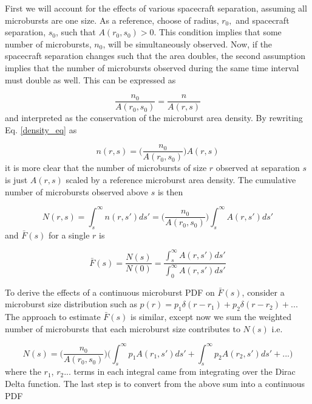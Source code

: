 \documentclass[draft]{agujournal2019}
\begin{document}
First we will account for the effects of various spacecraft separation, assuming all microbursts are one size. As a reference, choose of radius, $r_0,$ and spacecraft separation, $s_0$, such that $A(r_0, s_0) > 0$. This condition implies that some number of microbursts, $n_0$, will be simultaneously observed. Now, if the spacecraft separation changes such that the area doubles, the second assumption implies that the number of microbursts observed during the same time interval must double as well. This can be expressed as 

\begin{equation} \label{density_eq}
\frac{n_0}{A(r_0, s_0)} = \frac{n}{A(r, s)}
\end{equation} and interpreted as the conservation of the microburst area density. By rewriting Eq. \ref{density_eq} as

\begin{equation}
n(r, s) = \bigg( \frac{n_0}{A(r_0, s_0)} \bigg) A(r, s)
\end{equation} it is more clear that the number of microbursts of size $r$ observed at separation $s$ is just $A(r, s)$ scaled by a reference microburst area density. The cumulative number of microbursts observed above $s$ is then

\begin{equation}
N(r, s) = \int_{s}^\infty n(r, s') ds' = \bigg( \frac{n_0}{A(r_0, s_0)} \bigg) \int_{s}^\infty A(r, s') ds'
\end{equation} and $\bar{F}(s)$ for a single $r$ is

\begin{equation}
\bar{F}(s) = \frac{N(s)}{N(0)} = \frac{\int_{s}^\infty A(r, s') ds'}{\int_{0}^\infty A(r, s') ds'}
\end{equation}

To derive the effects of a continuous microburst PDF on $\bar{F}(s)$, consider a microburst size distribution such as $p(r) = p_1 \delta (r-r_1) + p_2 \delta (r-r_2) + ...$ The approach to estimate $\bar{F}(s)$ is similar, except now we sum the weighted number of microbursts that each microburst size contributes to $N(s)$ i.e.

\begin{equation}
N(s) = \bigg( \frac{n_0}{A(r_0, s_0)} \bigg) \bigg( \int_{s}^\infty p_1 A(r_1, s') ds' + \int_{s}^\infty p_2 A(r_2, s') ds' + ...\bigg)
\end{equation} where the $r_1$, $r_2$... terms in each integral came from integrating over the Dirac Delta function. The last step is to convert from the above sum into a continuous PDF
\end{document}
